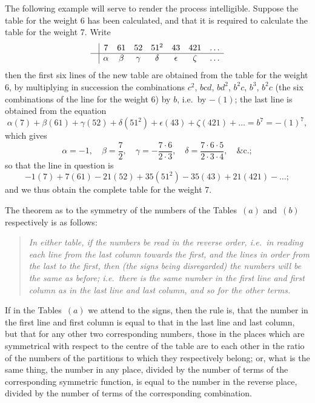 \documentclass[11pt,a4paper]{book}
\begin{document}
\begin{center}
The following example will serve to render the process intelligible. Suppose
the table for the weight 6 has been calculated, and that it is required to
calculate the table for the weight 7. Write
\[
\begin{array}{c|ccccccc}
& 7 & 61 & 52 & 51^2 & 43 & 421 & \ldots \\ \hline
& \alpha & \beta & \gamma & \delta & \epsilon & \zeta & \ldots
\end{array}
\]
then the first six lines of the new table are obtained from the table for the
weight 6, by multiplying in succession the combinations
$c^2$, $bcd$, $bd^2$, $b^2 c$, $b^3$, $b^2 c$ (the six combinations of the
line for the weight 6) by $b$, i.e.\ by $-(1)$; the last line is obtained
from the equation
\[
\alpha(7) + \beta(61) + \gamma(52) + \delta(51^2) + \epsilon(43) + \zeta(421)
+ \ldots = b^7 = -(1)^7,
\]
which gives
\[\alpha = -1, \quad \beta = \frac{7}{2}, \quad \gamma = -\frac{7\cdot 6}{2\cdot 3},
\quad \delta = \frac{7\cdot 6\cdot 5}{2\cdot 3\cdot 4}, \quad \&\text{c.};\]
so that the line in question is
\[
-1(7) + 7(61) - 21(52) + 35(51^2) - 35(43) + 21(421) - \ldots;
\]
and we thus obtain the complete table for the weight 7.

The theorem as to the symmetry of the numbers of the Tables~$(a)$ and~$(b)$
respectively is as follows:
\begin{quote}
\textit{In either table, if the numbers be read in the reverse order, i.e.\ in
reading each line from the last column towards the first, and the lines in
order from the last to the first, then (the signs being disregarded) the
numbers will be the same as before; i.e.\ there is the same number in the
first line and first column as in the last line and last column, and so for
the other terms.}
\end{quote}

If in the Tables~$(a)$ we attend to the signs, then the rule is, that the
number in the first line and first column is equal to that in the last line
and last column, but that for any other two corresponding numbers, those in
the places which are symmetrical with respect to the centre of the table are
to each other in the ratio of the numbers of the partitions to which they
respectively belong; or, what is the same thing, the number in any place,
divided by the number of terms of the corresponding symmetric function, is
equal to the number in the reverse place, divided by the number of terms of
the corresponding combination.


\end{center}
\end{document}
